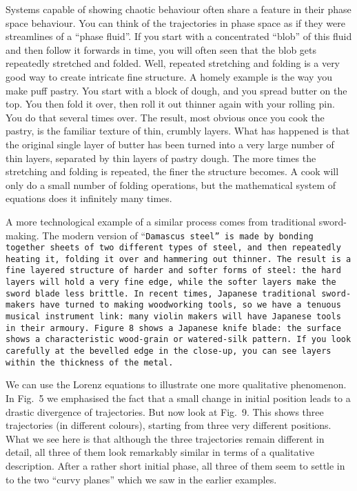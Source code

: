   Systems capable of showing chaotic behaviour often share a feature in their 
  phase space behaviour. You can think of the trajectories in phase space as if 
  they were streamlines of a “phase fluid”. If you start with a concentrated 
  “blob” of this fluid and then follow it forwards in time, you will often seen 
  that the blob gets repeatedly stretched and folded. Well, repeated stretching 
  and folding is a very good way to create intricate fine structure. A homely 
  example is the way you make puff pastry. You start with a block of dough, and 
  you spread butter on the top. You then fold it over, then roll it out thinner 
  again with your rolling pin. You do that several times over. The result, most 
  obvious once you cook the pastry, is the familiar texture of thin, crumbly 
  layers. What has happened is that the original single layer of butter has 
  been turned into a very large number of thin layers, separated by thin layers 
  of pastry dough. The more times the stretching and folding is repeated, the 
  finer the structure becomes. A cook will only do a small number of folding 
  operations, but the mathematical system of equations does it infinitely many 
  times. 

  A more technological example of a similar process comes from traditional 
  sword-making. The modern version of “\tt{}Damascus steel\rm{}” is made by 
  bonding together sheets of two different types of steel, and then repeatedly 
  heating it, folding it over and hammering out thinner. The result is a fine 
  layered structure of harder and softer forms of steel: the hard layers will 
  hold a very fine edge, while the softer layers make the sword blade less 
  brittle. In recent times, Japanese traditional sword-makers have turned to 
  making woodworking tools, so we have a tenuous musical instrument link: many 
  violin makers will have Japanese tools in their armoury. Figure 8 shows a 
  Japanese knife blade: the surface shows a characteristic wood-grain or 
  watered-silk pattern. If you look carefully at the bevelled edge in the 
  close-up, you can see layers within the thickness of the metal. 

  We can use the Lorenz equations to illustrate one more qualitative 
  phenomenon. In Fig.\ 5 we emphasised the fact that a small change in initial 
  position leads to a drastic divergence of trajectories. But now look at Fig.\ 
  9. This shows three trajectories (in different colours), starting from three 
  very different positions. What we see here is that although the three 
  trajectories remain different in detail, all three of them look remarkably 
  similar in terms of a qualitative description. After a rather short initial 
  phase, all three of them seem to settle in to the two “curvy planes” which we 
  saw in the earlier examples. 

